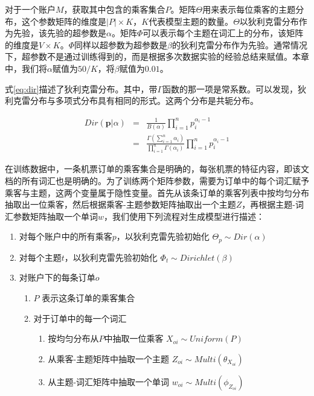 对于一个账户$M$，获取其中包含的乘客集合$P$。矩阵$\Theta$用来表示每位乘客的主题分布，这个参数矩阵的维度是$|P| \times K$，$K$代表模型主题的数量。$\Theta$以狄利克雷分布作为先验，该先验的超参数是$\alpha$。矩阵$\Phi$可以表示每个主题在词汇上的分布，该矩阵的维度是$V \times K$。$\Phi$同样以超参数为超参数是$\beta$的狄利克雷分布作为先验。通常情况下，超参数不是通过训练得到的，而是根据多次数据实验的经验总结来赋值。本章中，我们将$\alpha$赋值为$50/K$，将$\beta$赋值为$0.01$。

式\ref{eq:dir}描述了狄利克雷分布。其中，带$\Gamma$函数的那一项是常系数。可以发现，狄利克雷分布与多项式分布具有相同的形式。这两个分布是共轭分布。

\begin{eqnarray}
\label{eq:dir}
	Dir(\mathbf{p}|\alpha) & = & \frac{1}{B(\alpha)}\prod_{i=1}^n p_i^{\alpha_i-1} \nonumber \\
	& = & \frac{\Gamma(\sum_{i=1}^n \alpha_i)}{\prod_{i=1}^n \Gamma(\alpha_i)}\prod_{i=1}^n p_i^{\alpha_i-1}
\end{eqnarray}

在训练数据中，一条机票订单的乘客集合是明确的，每张机票的特征内容，即该文档的所有词汇也是明确的。为了训练两个矩阵参数，需要为订单中的每个词汇赋予乘客与主题，这两个变量属于隐性变量。首先从该条订单的乘客列表中按均匀分布抽取出一位乘客，然后根据乘客-主题参数矩阵抽取出一个主题$Z$，再根据主题-词汇参数矩阵抽取一个单词$w$，我们使用下列流程对生成模型进行描述：

\begin{enumerate}
\item 对每个账户中的所有乘客$p$，以狄利克雷先验初始化 $\Theta_p \sim Dir(\alpha)$
\item 对每个主题$t$，以狄利克雷先验初始化 $\Phi_t \sim Dirichlet(\beta)$
\item 对账户下的每条订单$o$
       \begin{enumerate}[fullwidth,itemindent=1em,label=(\alph*)]
       \item $P$ 表示这条订单的乘客集合
       \item 对于订单中的每一个词汇
              \begin{enumerate}[fullwidth,itemindent=2em,label=(\roman*)]
              \item 按均匀分布从$P$中抽取一位乘客 $X_{oi} \sim Uniform(P)$
              \item 从乘客-主题矩阵中抽取一个主题 $Z_{oi} \sim Multi(\theta_{X_{oi}})$
              \item 从主题-词汇矩阵中抽取一个单词 $w_{oi} \sim Multi(\phi_{Z_{oi}})$
              \end{enumerate}
       \end{enumerate}
\end{enumerate}


